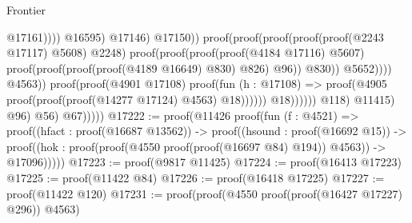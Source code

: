 \begin{lexlean}{Frontier}
\begin{coremodule}
                                                                                  @17161))))
                                                                        @16595)
                                                                      @17146)
                                                                    @17150))
                                                              proof(proof(proof(proof(proof(@2243
                                                                          @17117)
                                                                        @5608)
                                                                      @2248)
                                                                    proof(proof(proof(proof(@4184
                                                                              @17116)
                                                                            @5607)
                                                                          proof(proof(proof(proof(@4189
                                                                                    @16649)
                                                                                  @830)
                                                                                @826)
                                                                              @96))
                                                                        @830))
                                                                  @5652))))
                                                    @4563))
                                              proof(proof(@4901 @17108)
                                                  proof(fun (h : @17108) =>
                                                    proof(@4905
                                                        proof(proof(proof(@14277 @17124) @4563)
                                                            @18))))))
                                        @18))))))
                        @118)
                      @11415)
                    @96)
                  @56)
                @67)))))
@17222 := proof(@11426
      proof(fun (f : @4521) =>
        proof((hfact : proof(@16687 @13562)) ->
          proof((hsound : proof(@16692 @15)) ->
            proof((hok : proof(proof(@4550 proof(proof(@16697 @84) @194)) @4563)) -> @17096)))))
@17223 := proof(@9817 @11425)
@17224 := proof(@16413 @17223)
@17225 := proof(@11422 @84)
@17226 := proof(@16418 @17225)
@17227 := proof(@11422 @120)
@17231 := proof(proof(@4550 proof(proof(@16427 @17227) @296)) @4563)

\end{coremodule}
\end{lexlean}
